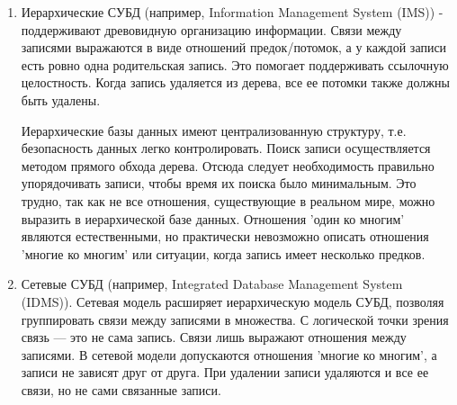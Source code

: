 \documentclass[12pt,a4paper,oneside]{article} %
\begin{document}
\begin{enumerate}
\item Иерархические СУБД (например, Information Management System (IMS)) \linebreak
- поддерживают древовидную организацию информации. Связи между записями \linebreak
выражаются в виде отношений предок/потомок, а у каждой записи есть \linebreak
ровно одна родительская запись. Это помогает поддерживать ссылочную \linebreak
целостность. Когда запись удаляется из дерева, все ее потомки также \linebreak
должны быть удалены.

Иерархические базы данных имеют централизованную структуру, \linebreak
т.е. безопасность данных легко контролировать. Поиск записи \linebreak
осуществляется методом прямого обхода дерева. Отсюда следует \linebreak
необходимость правильно упорядочивать записи, чтобы время их \linebreak
поиска было минимальным. Это трудно, так как не все отношения, \linebreak
существующие в реальном мире, можно выразить в иерархической \linebreak
базе данных. Отношения 'один ко многим' являются естественными, \linebreak
но практически невозможно описать отношения 'многие ко многим' \linebreak
или ситуации, когда запись имеет несколько предков.
\item Сетевые СУБД (например, Integrated Database Management \linebreak
System (IDMS)). Сетевая модель расширяет иерархическую модель СУБД, \linebreak
позволяя группировать связи между записями в множества. С \linebreak
логической точки зрения связь — это не сама запись. Связи лишь \linebreak
выражают отношения между записями. В сетевой модели допускаются \linebreak
отношения 'многие ко многим', а записи не зависят друг от \linebreak
друга. При удалении записи удаляются и все ее связи, но не сами \linebreak
связанные записи.


\end{enumerate}
\end{document}
